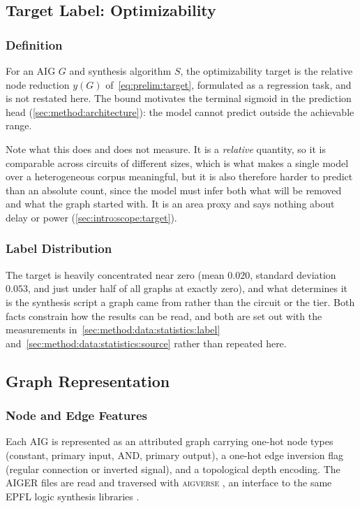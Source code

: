 \subsection{Target Label: Optimizability}
\label{sec:method:data:label}

\subsubsection{Definition}
\label{sec:method:data:label:definition}
For an AIG $G$ and synthesis algorithm $S$, the optimizability target is the relative node
reduction $y(G)$ of~\eqref{eq:prelim:target}, formulated as a regression task, and is not
restated here. The bound motivates the terminal sigmoid in the prediction
head (\ref{sec:method:architecture}): the model cannot predict outside the achievable range.

Note what this does and does not measure. It is a \emph{relative} quantity, so it is
comparable across circuits of different sizes, which is what makes a single model over a
heterogeneous corpus meaningful, but it is also therefore harder to predict than an
absolute count, since the model must infer both what will be removed and what the graph
started with. It is an area proxy and says nothing about delay or power
(\ref{sec:intro:scope:target}).

\subsubsection{Label Distribution}
\label{sec:method:data:label:distribution}
The target is heavily concentrated near zero (mean $0.020$, standard deviation $0.053$,
and just under half of all graphs at exactly zero), and what determines it is the synthesis
script a graph came from rather than the circuit or the tier. Both facts constrain how the
results can be read, and both are set out with the measurements
in~\ref{sec:method:data:statistics:label} and~\ref{sec:method:data:statistics:source} rather
than repeated here.

\subsection{Graph Representation}
\label{sec:method:data:representation}

\subsubsection{Node and Edge Features}
\label{sec:method:data:representation:features}
Each AIG is represented as an attributed graph carrying one-hot node types (constant,
primary input, AND, primary output), a one-hot edge inversion flag (regular connection or
inverted signal), and a topological depth encoding. The AIGER files are read and traversed with
\textsc{aigverse} \citep{walter2025aigverse}, an interface to the same EPFL logic synthesis
libraries \citep{soeken2018epfl}.

